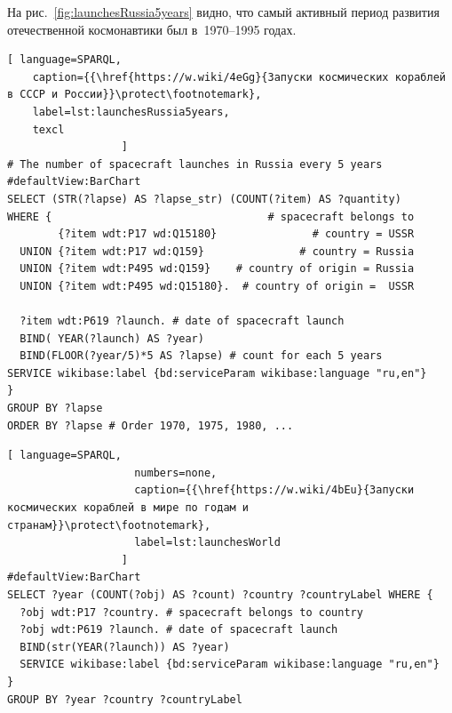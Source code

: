 На рис.~\ref{fig:launchesRussia5years} видно, 
что самый активный период развития отечественной космонавтики был в~1970--1995 годах.



\newpage


\begin{lstlisting}[ language=SPARQL, 
    caption={{\href{https://w.wiki/4eGg}{Запуски космических кораблей в СССР и России}}\protect\footnotemark}, 
    label=lst:launchesRussia5years,
    texcl
                  ]
# The number of spacecraft launches in Russia every 5 years
#defaultView:BarChart
SELECT (STR(?lapse) AS ?lapse_str) (COUNT(?item) AS ?quantity)
WHERE {                                  # spacecraft belongs to
        {?item wdt:P17 wd:Q15180}               # country = USSR
  UNION {?item wdt:P17 wd:Q159}               # country = Russia
  UNION {?item wdt:P495 wd:Q159}    # country of origin = Russia
  UNION {?item wdt:P495 wd:Q15180}.  # country of origin =  USSR
  
  ?item wdt:P619 ?launch. # date of spacecraft launch
  BIND( YEAR(?launch) AS ?year) 
  BIND(FLOOR(?year/5)*5 AS ?lapse) # count for each 5 years
SERVICE wikibase:label {bd:serviceParam wikibase:language "ru,en"}
} 
GROUP BY ?lapse
ORDER BY ?lapse # Order 1970, 1975, 1980, ...
\end{lstlisting}



\begin{lstlisting}[ language=SPARQL, 
                    numbers=none, 
                    caption={{\href{https://w.wiki/4bEu}{Запуски космических кораблей в мире по годам и странам}}\protect\footnotemark}, 
                    label=lst:launchesWorld
                  ]
#defaultView:BarChart
SELECT ?year (COUNT(?obj) AS ?count) ?country ?countryLabel WHERE {
  ?obj wdt:P17 ?country. # spacecraft belongs to country 
  ?obj wdt:P619 ?launch. # date of spacecraft launch
  BIND(str(YEAR(?launch)) AS ?year)
  SERVICE wikibase:label {bd:serviceParam wikibase:language "ru,en"}
}
GROUP BY ?year ?country ?countryLabel
\end{lstlisting}



